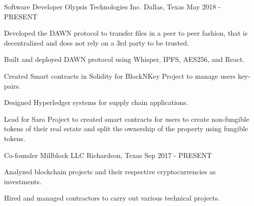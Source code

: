 

\begin{cventries}

  \cventry
    {Software Developer} %
    {Olypsis Technologies Inc.} %
    {Dallas, Texas} %
    {May 2018 - PRESENT} %
    {
      \begin{cvitems} %
        \item {Developed the DAWN protocol to transfer files in a peer to peer fashion, that is decentralized and does not rely on a 3rd party to be trusted.}
        \item {Built and deployed DAWN protocol using Whisper, IPFS, AES256, and React.}
        \item {Created Smart contracts in Solidity for BlockNKey Project to manage users key-pairs.}
        \item {Designed Hyperledger systems for supply chain applications.}
        \item {Lead for Saro Project to created smart contracts for users to create non-fungible tokens of their real estate and split the ownership of the property using fungible tokens.}
      \end{cvitems}
    }

  \cventry
    {Co-founder} %
    {Millblock LLC} %
    {Richardson, Texas} %
    {Sep 2017 - PRESENT} %
    {
      \begin{cvitems} %
        \item {Analyzed blockchain projects and their respective cryptocurrencies as investments.}
        \item {Hired and managed contractors to carry out various technical projects.}
      \end{cvitems}
    }


\end{cventries}
